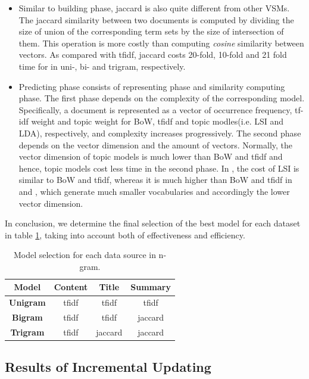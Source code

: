 \begin{itemize}
\item Similar to building phase, jaccard is also quite different from other VSMs. The jaccard similarity between two documents is computed by dividing the size of union of the corresponding term sets by the size of intersection of them. This operation is more costly than computing \textit{cosine} similarity between vectors. As compared with tfidf, jaccard costs 20-fold, 10-fold and 21 fold time for \icontent{} in uni-, bi- and trigram, respectively.

\item Predicting phase consists of representing phase and similarity computing phase. The first phase depends on the complexity of the corresponding model. Specifically, a document is represented as a vector of occurrence frequency, tf-idf weight and topic weight for BoW, tfidf and topic modles(i.e. LSI and LDA), respectively, and complexity increases progressively. The second phase depends on the vector dimension and the amount of vectors. Normally, the vector dimension of topic models is much lower than BoW and tfidf and hence, topic models cost less time in the second phase. In \icontent{}, the cost of LSI is similar to BoW and tfidf, whereas it is much higher than BoW and tfidf in \ititle{} and \isummary{}, which generate much smaller vocabularies and accordingly the lower vector dimension. 

\end{itemize} 

In conclusion, we determine the final selection of the best model for each dataset in table \ref{tab:select}, taking into account both of effectiveness and efficiency.

\begin{table}[!htb]
\centering
\begin{tabular}{|c|c|c|c|}
\hline
\textbf{Model} & \textbf{Content} & \textbf{Title} & \textbf{Summary} \\ \hline
\textbf{Unigram} & tfidf & tfidf & tfidf \\ \hline
\textbf{Bigram} & tfidf & tfidf & jaccard \\ \hline
\textbf{Trigram} & tfidf & jaccard & jaccard \\ \hline
\end{tabular}
\caption{Model selection for each data source in n-gram.}
\label{tab:select}
\end{table}

\subsection{Results of Incremental Updating}
\label{sec:5.4}


